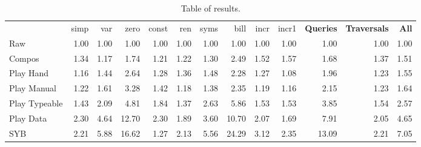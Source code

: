 \documentclass[preprint]{sigplanconf}
\begin{document}
\begin{table}
\caption{Table of results.}
\label{fig:results}
\vspace{3mm}
\begin{tabular*}{\textwidth}{lrrrrrrrrrrrr}
 & simp & var & zero & const & ren & syms & bill & incr & incr1 & \textbf{Queries} & \textbf{Traversals} & \textbf{All} \\
Raw            &  1.00 &  1.00 &  1.00 &  1.00 &  1.00 &  1.00 &  1.00 &  1.00 &  1.00 &  1.00 &  1.00 &  1.00 \\
Compos         &  1.34 &  1.17 &  1.74 &  1.21 &  1.22 &  1.30 &  2.49 &  1.52 &  1.57 &  1.68 &  1.37 &  1.51 \\
Play Hand      &  1.16 &  1.44 &  2.64 &  1.28 &  1.36 &  1.48 &  2.28 &  1.27 &  1.08 &  1.96 &  1.23 &  1.55 \\
Play Manual    &  1.22 &  1.61 &  3.28 &  1.42 &  1.18 &  1.38 &  2.35 &  1.19 &  1.16 &  2.15 &  1.23 &  1.64 \\
Play Typeable  &  1.43 &  2.09 &  4.81 &  1.84 &  1.37 &  2.63 &  5.86 &  1.53 &  1.53 &  3.85 &  1.54 &  2.57 \\
Play Data      &  2.30 &  4.64 & 12.70 &  2.30 &  1.89 &  3.60 & 10.70 &  2.07 &  1.69 &  7.91 &  2.05 &  4.65 \\
SYB            &  2.21 &  5.88 & 16.62 &  1.27 &  2.13 &  5.56 & 24.29 &  3.12 &  2.35 & 13.09 &  2.21 &  7.05 \\
\hline
\end{tabular*}
\end{table}
\end{document}
